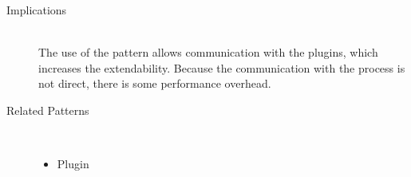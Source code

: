 \begin{description}
\item [Implications]~\\
The use of the  pattern allows communication with the plugins, which increases the extendability. 
Because the communication with the process is not direct, there is some performance overhead.

\item [Related Patterns]~
\begin{itemize}
\item Plugin
\end{itemize}

\end{description}

